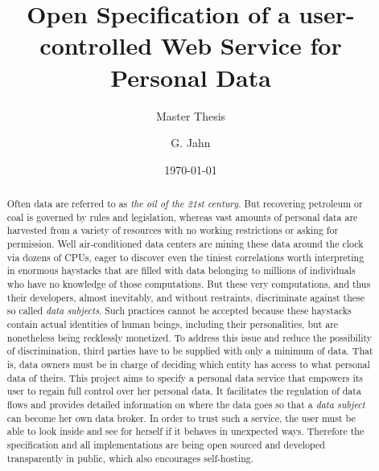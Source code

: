 \documentclass[12pt,english,a4paper,titlepage,cleardoublepage=empty,dottedtoc]{report}
\title{Open Specification of a user-controlled Web Service for Personal Data}
\subtitle{Master Thesis}
\author{G. Jahn}
\date{\today}
\begin{document}

\begin{abstract}
Often data are referred to as \emph{the oil of the 21st century}. But
recovering petroleum or coal is governed by rules and legislation,
whereas vast amounts of personal data are harvested from a variety of
resources with no working restrictions or asking for permission. Well
air-conditioned data centers are mining these data around the clock via
dozens of CPUs, eager to discover even the tiniest correlations worth
interpreting in enormous haystacks that are filled with data belonging
to millions of individuals who have no knowledge of those computations.
But these very computations, and thus their developers, almost
inevitably, and without restraints, discriminate against these so called
\emph{data subjects}. Such practices cannot be accepted because these
haystacks contain actual identities of human beings, including their
personalities, but are nonetheless being recklessly monetized. To
address this issue and reduce the possibility of discrimination, third
parties have to be supplied with only a minimum of data. That is, data
owners must be in charge of deciding which entity has access to what
personal data of theirs. This project aims to specify a personal data
service that empowers its user to regain full control over her personal
data. It facilitates the regulation of data flows and provides detailed
information on where the data goes so that a \emph{data subject} can
become her own data broker. In order to trust such a service, the user
must be able to look inside and see for herself if it behaves in
unexpected ways. Therefore the specification and all implementations are
being open sourced and developed transparently in public, which also
encourages self-hosting.
\end{abstract}

\end{document}
